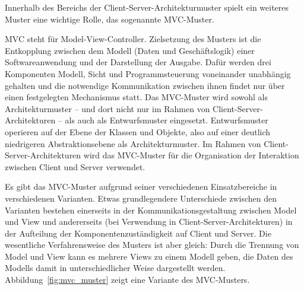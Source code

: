 
\vspace{1mm} %

Innerhalb des Bereichs der Client-Server-Architekturmuster spielt ein weiteres 
\linebreak %
Muster eine wichtige Rolle, das sogenannte MVC-Muster.

MVC steht für Model-View-Controller. Zielsetzung des Musters ist die Entkopplung zwischen dem Modell (Daten und Geschäftslogik) einer Soft\-ware\-an\-wen\-dung und der Darstellung der Ausgabe. Dafür werden drei Komponenten Modell, Sicht und Programmsteuerung voneinander unabhängig gehalten und die notwendige Kommunikation zwischen ihnen findet nur über einen festgelegten Mechanismus statt. Das MVC-Muster wird sowohl als Architekturmuster – und dort nicht nur im Rahmen von Client-Server-Architekturen – als auch als Entwurfsmuster eingesetzt. Entwurfs\-muster operieren auf der Ebene der Klassen und Objekte, also auf einer deutlich niedrigeren Abstraktionsebene als Architekturmuster. Im Rahmen von Client-Server-Architekturen wird das MVC-Muster für die Organisation der Interaktion zwischen Client und Server verwendet. 

Es gibt das MVC-Muster aufgrund seiner verschiedenen Einsatzbereiche in verschiedenen Varianten. Etwas grundlegendere Unterschiede zwischen den Varianten bestehen einerseits in der Kommunikationsgestaltung zwischen Model und View und andererseits (bei Verwendung in Client-Server-Architekturen) in der Aufteilung der Komponentenzuständigkeit auf Client und Server. Die wesentliche Verfahrensweise des Musters ist aber gleich: Durch die Trennung von Model und View kann es mehrere Views zu einem Modell geben, die Daten des Modells damit in unterschiedlicher Weise dargestellt werden. Abbildung~\ref{fig:mvc_muster} zeigt eine Variante des MVC-Musters. 

